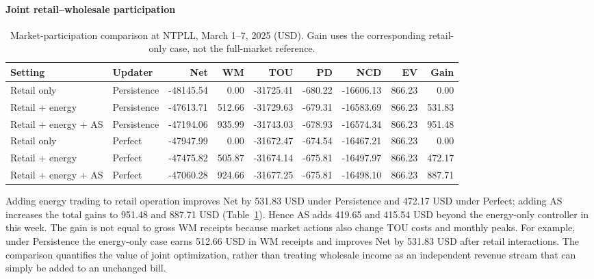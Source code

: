 \documentclass[final,5p,times]{elsarticle}
\begin{document}
\paragraph{Joint retail--wholesale participation}
\begin{table}[p]
\centering
\caption{Market-participation comparison at NTPLL, March 1--7, 2025 (USD). Gain uses the corresponding retail-only case, not the full-market reference.}
\label{tab:weekly_markets}
\footnotesize
\setlength{\tabcolsep}{3pt}
\begin{tabular}{llrrrrrrr}
\toprule
Setting & Updater & Net & WM & TOU & PD & NCD & EV & Gain \\
\midrule
Retail only & Persistence & -48145.54 & 0.00 & -31725.41 & -680.22 & -16606.13 & 866.23 & 0.00 \\
Retail + energy & Persistence & -47613.71 & 512.66 & -31729.63 & -679.31 & -16583.69 & 866.23 & 531.83 \\
Retail + energy + AS & Persistence & -47194.06 & 935.99 & -31743.03 & -678.93 & -16574.34 & 866.23 & 951.48 \\
\midrule
Retail only & Perfect & -47947.99 & 0.00 & -31672.47 & -674.54 & -16467.21 & 866.23 & 0.00 \\
Retail + energy & Perfect & -47475.82 & 505.87 & -31674.14 & -675.81 & -16497.97 & 866.23 & 472.17 \\
Retail + energy + AS & Perfect & -47060.28 & 924.66 & -31677.25 & -675.81 & -16498.10 & 866.23 & 887.71 \\
\bottomrule
\end{tabular}
\end{table}

Adding energy trading to retail operation improves Net by 531.83 USD under
Persistence and 472.17 USD under Perfect; adding AS increases the total
gains to 951.48 and 887.71 USD (Table~\ref{tab:weekly_markets}). Hence AS
adds 419.65 and 415.54 USD beyond the energy-only controller in this week.
The gain is not equal to gross WM receipts because market actions also
change TOU costs and monthly peaks. For example, under Persistence the
energy-only case earns 512.66 USD in WM receipts and improves Net by
531.83 USD after retail interactions. The comparison quantifies the value
of joint optimization, rather than treating wholesale income as an
independent revenue stream that can simply be added to an unchanged bill.
\end{document}
